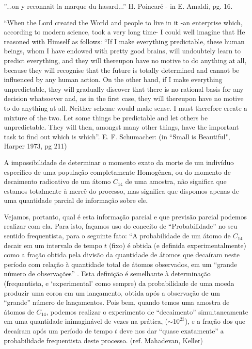 \begin{citacao}

    ''...on y reconnait la marque du hasard...'' H. Poincaré - in E. Amaldi, pg. 16.

    ``When the Lord created the World and people to live in it -an enterprise which, according to modern science, took a very long time- I could well imagine that He reasoned with Himself as follows: ``If I make everything predictable, these human beings, whom I have endowed with pretty good brains, will undoubtely learn to predict everything, and they will thereupon have no motive to do anything at all, because they will recognise that the future is totally determined and cannot be influenced by any human action. On the other hand, if I make everything unpredictable, they will gradually discover that there is no rational basis for any decision whatsoever and, as in the first case, they will thereupon have no motive to do anything at all. Neither scheme would make sense. I must therefore create a mixture of the two. Let some things be predictable and let others be unpredictable. They will then, amongst many other things, have the important task to find out which is which''. E. F. Schumacher: (in ``Small is Beautiful", Harper 1973, pg 211)
\end{citacao}

    A impossibilidade de determinar o momento exato da morte de um indivíduo específico de uma população completamente Homogênea, ou do momento de decaimento radioativo de um átomo \(C_{14}\) de uma amostra, não significa que estamos totalmente à mercê do processo, mas significa que dispomos apenas de uma quantidade parcial de informação sobre ele.
    
    Vejamos, portanto, qual é esta informação parcial e que previsão parcial podemos realizar com ela. Para isto, façamos uso do conceito de ``Probabilidade'' no seu sentido frequentista, para o seguinte fato: ``A probabilidade de um átomo de \(C_{14}\) decair em um intervalo de tempo \(t\) (fixo) é obtida (e definida experimentalmente) como a fração obtida pela divisão da quantidade de átomos que decaíram neste período com relação à quantidade total de átomos observados, em um ``grande número de observações'' . Esta definição é semelhante à determinação (frequentista, e `experimental' como sempre) da probabilidade de uma moeda produzir uma coroa em um lançamento, obtida após a observação de um ``grande'' número de lançamentos. Pois bem, quando temos uma amostra de átomos de \(C_{14}\), podemos realizar o experimento de ``decaimento'' simultaneamente em uma quantidade inimaginável de vezes na prática, (\(\sim 10^{23}\)), e a fração dos que decaíram após um período de tempo \(t\) deve nos dar ``quase exatamente'' a probabilidade frequentista deste processo. (ref. Mahadevan, Keller)


